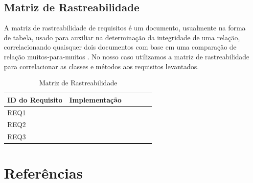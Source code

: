 \documentclass[12pt]{elsarticle}
\begin{document}
    \subsection{Matriz de Rastreabilidade}
    
    A matriz de rastreabilidade de requisitos é um documento, usualmente na forma de tabela, usado para auxiliar na determinação da integridade de uma relação, correlacionando quaisquer dois documentos com base em uma comparação de relação muitos-para-muitos \cite{rast}. No nosso caso utilizamos a matriz de rastreabilidade para correlacionar as classes e métodos aos requisitos levantados.
    
\begin{table}[H]
\centering
\caption{Matriz de Rastreabilidade}
\vspace{0.5cm}
\label{rastreabilidade}
\begin{tabular}{|l|l|l|l|l|l|}
\hline
ID do Requisito 	& Implementação 	 	\\ \hline
REQ1		&    				\\ \hline
REQ2		&  					\\ \hline
REQ3		&  					\\ \hline
\end{tabular}
\end{table}
    
    
	\newpage
	
    
    \section*{Referências}
    
\end{document}
